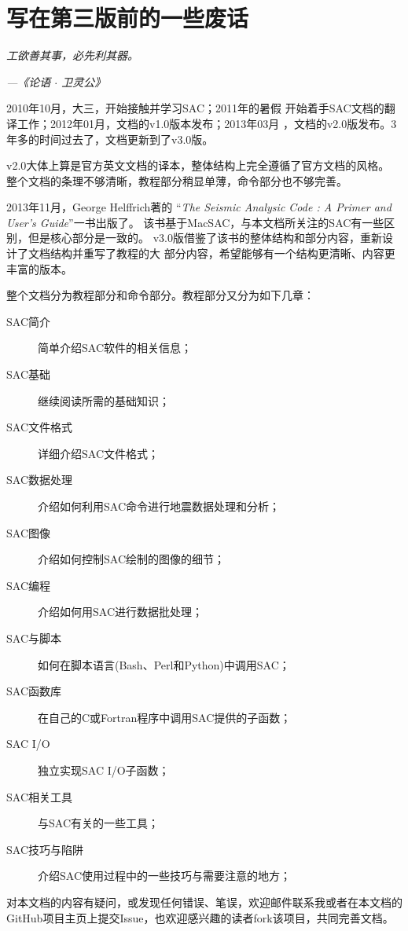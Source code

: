 {\section*{写在第三版前的一些废话}}

\begin{shadequote*}
\Large\emph{
工欲善其事，必先利其器。
}
\par\hfill\emph{\normalsize---《论语 $\cdot$ 卫灵公》}
\end{shadequote*}

2010年10月，大三，开始接触并学习SAC；2011年的暑假
开始着手SAC文档的翻译工作；2012年01月，文档的v1.0版本发布；2013年03月
，文档的v2.0版发布。3年多的时间过去了，文档更新到了v3.0版。

v2.0大体上算是官方英文文档的译本，整体结构上完全遵循了官方文档的风格。
整个文档的条理不够清晰，教程部分稍显单薄，命令部分也不够完善。

2013年11月，George Helffrich著的
``\emph{The Seismic Analysic Code : A Primer and User's Guide}''一书出版了。
该书基于MacSAC，与本文档所关注的SAC有一些区别，但是核心部分是一致的。
v3.0版借鉴了该书的整体结构和部分内容，重新设计了文档结构并重写了教程的大
部分内容，希望能够有一个结构更清晰、内容更丰富的版本。

整个文档分为教程部分和命令部分。教程部分又分为如下几章：
\begin{description}
\item[SAC简介] 简单介绍SAC软件的相关信息；
\item[SAC基础] 继续阅读所需的基础知识；
\item[SAC文件格式] 详细介绍SAC文件格式；
\item[SAC数据处理] 介绍如何利用SAC命令进行地震数据处理和分析；
\item[SAC图像] 介绍如何控制SAC绘制的图像的细节；
\item[SAC编程] 介绍如何用SAC进行数据批处理；
\item[SAC与脚本] 如何在脚本语言(Bash、Perl和Python)中调用SAC；
\item[SAC函数库] 在自己的C或Fortran程序中调用SAC提供的子函数；
\item[SAC I/O] 独立实现SAC I/O子函数；
\item[SAC相关工具] 与SAC有关的一些工具；
\item[SAC技巧与陷阱] 介绍SAC使用过程中的一些技巧与需要注意的地方；
\end{description}

对本文档的内容有疑问，或发现任何错误、笔误，欢迎邮件联系我或者在本文档的
GitHub项目主页上提交Issue，也欢迎感兴趣的读者fork该项目，共同完善文档。

